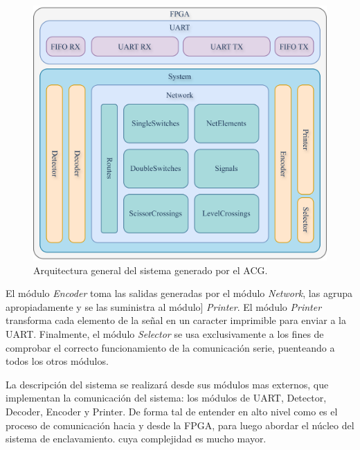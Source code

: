 	\begin{figure}[H]
		\centering
		\includegraphics[width=1\textwidth]{Figuras/Arq_general.png}
		\centering\caption{Arquitectura general del sistema generado por el ACG.}
		\label{fig:GeneralSystem}
	\end{figure}
	
	El módulo \textit{Encoder} toma las salidas generadas por el módulo \textit{Network}, las agrupa apropiadamente y se las suministra al módulo] \textit{Printer}. El módulo \textit{Printer} transforma cada elemento de la señal en un caracter imprimible para enviar a la UART. Finalmente, el módulo \textit{Selector} se usa exclusivamente a los fines de comprobar el correcto funcionamiento de la comunicación serie, puenteando a todos los otros módulos.
	
	La descripción del sistema se realizará desde sus módulos mas externos, que implementan la comunicación del sistema: los módulos de UART, Detector, Decoder, Encoder y Printer. De forma tal de entender en alto nivel como es el proceso de comunicación hacia y desde la FPGA, para luego abordar el núcleo del sistema de enclavamiento. cuya complejidad es mucho mayor.		
	
	
	
	
	
	
	
	